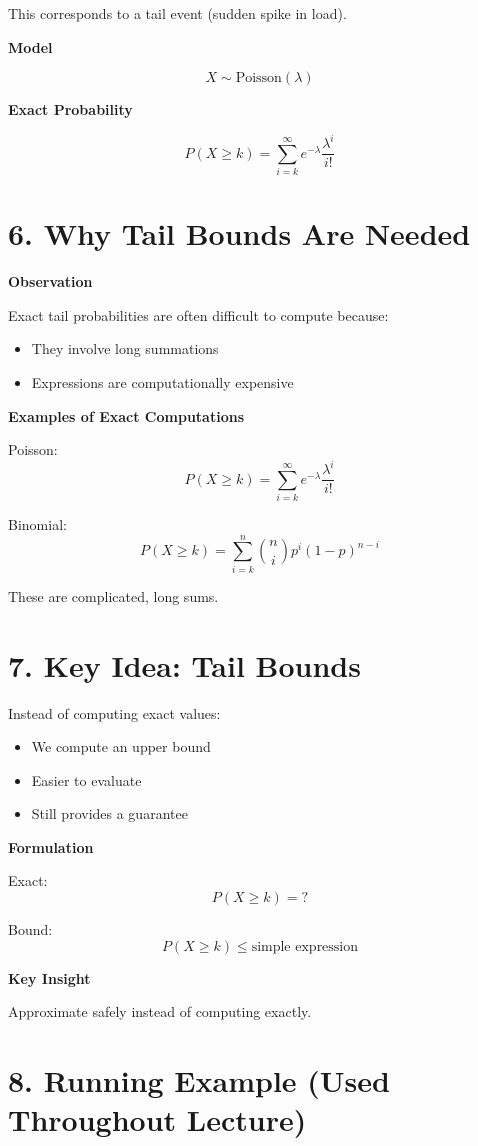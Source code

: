 \documentclass[12pt]{article}
\begin{document}
This corresponds to a tail event (sudden spike in load).

\textbf{Model}

\[
X \sim \text{Poisson}(\lambda)
\]

\textbf{Exact Probability}

\[
P(X \geq k) = \sum_{i=k}^{\infty} e^{-\lambda} \frac{\lambda^i}{i!}
\]

\section*{6. Why Tail Bounds Are Needed}

\textbf{Observation}

Exact tail probabilities are often difficult to compute because:

\begin{itemize}
\item They involve long summations
\item Expressions are computationally expensive
\end{itemize}

\textbf{Examples of Exact Computations}

Poisson:
\[
P(X \geq k) = \sum_{i=k}^{\infty} e^{-\lambda} \frac{\lambda^i}{i!}
\]

Binomial:
\[
P(X \geq k) = \sum_{i=k}^{n} \binom{n}{i} p^i (1-p)^{n-i}
\]

These are complicated, long sums.

\section*{7. Key Idea: Tail Bounds}

Instead of computing exact values:

\begin{itemize}
\item We compute an upper bound
\item Easier to evaluate
\item Still provides a guarantee
\end{itemize}

\textbf{Formulation}

Exact: 
\[
P(X \geq k) = ?
\]

Bound:
\[
P(X \geq k) \leq \text{simple expression}
\]

\textbf{Key Insight}

Approximate safely instead of computing exactly.

\section*{8. Running Example (Used Throughout Lecture)}
\end{document}
